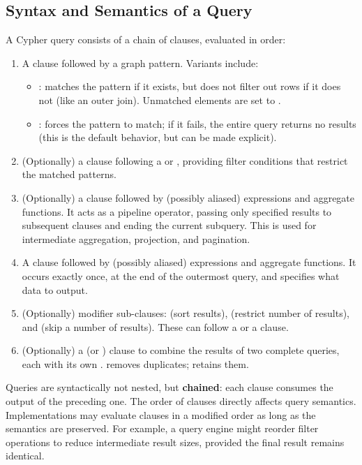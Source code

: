 \subsection{Syntax and Semantics of a Query}

A Cypher query consists of a chain of clauses, evaluated in order:

\begin{enumerate}
    \item A  clause followed by a graph pattern. Variants include:
    \begin{itemize}
        \item {}: matches the pattern if it exists, but does not filter out rows if it does not (like an outer join). Unmatched elements are set to .
        \item {}: forces the pattern to match; if it fails, the entire query returns no results (this is the default behavior, but can be made explicit).
    \end{itemize}
    \item (Optionally) a  clause following a  or , providing filter conditions that restrict the matched patterns.
    \item (Optionally) a  clause followed by (possibly aliased) expressions and aggregate functions. It acts as a pipeline operator, passing only specified results to subsequent clauses and ending the current subquery. This is used for intermediate aggregation, projection, and pagination.
    \item A  clause followed by (possibly aliased) expressions and aggregate functions. It occurs exactly once, at the end of the outermost query, and specifies what data to output.
    \item (Optionally) modifier sub-clauses:  (sort results),  (restrict number of results), and  (skip a number of results). These can follow a  or a  clause.
    \item (Optionally) a  (or ) clause to combine the results of two complete queries, each with its own .  removes duplicates;  retains them.
\end{enumerate}

Queries are syntactically not nested, but \textbf{chained}: each clause consumes the output of the preceding one. The order of clauses directly affects query semantics. Implementations may evaluate clauses in a modified order as long as the semantics are preserved. For example, a query engine might reorder filter operations to reduce intermediate result sizes, provided the final result remains identical.

